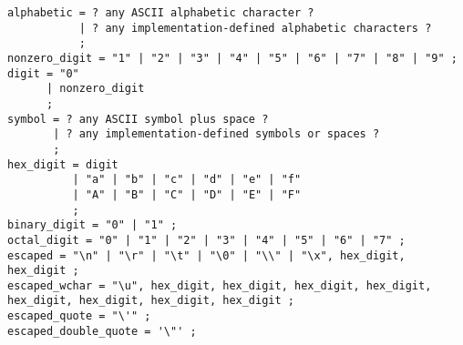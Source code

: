\documentclass[letterpaper,12pt]{book}
\begin{document}
\begin{lstlisting}[breaklines=true]
alphabetic = ? any ASCII alphabetic character ?
           | ? any implementation-defined alphabetic characters ?
           ;
nonzero_digit = "1" | "2" | "3" | "4" | "5" | "6" | "7" | "8" | "9" ;
digit = "0"
      | nonzero_digit
      ;
symbol = ? any ASCII symbol plus space ?
       | ? any implementation-defined symbols or spaces ?
       ;
hex_digit = digit
          | "a" | "b" | "c" | "d" | "e" | "f"
          | "A" | "B" | "C" | "D" | "E" | "F"
          ;
binary_digit = "0" | "1" ;
octal_digit = "0" | "1" | "2" | "3" | "4" | "5" | "6" | "7" ;
escaped = "\n" | "\r" | "\t" | "\0" | "\\" | "\x", hex_digit, hex_digit ;
escaped_wchar = "\u", hex_digit, hex_digit, hex_digit, hex_digit, hex_digit, hex_digit, hex_digit, hex_digit ;
escaped_quote = "\'" ;
escaped_double_quote = '\"' ;
\end{lstlisting}
\end{document}
